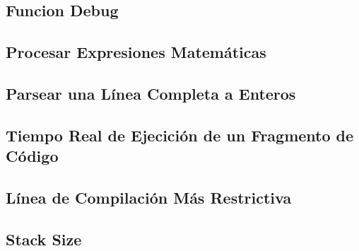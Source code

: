 \subsection{Funcion Debug}
\raggedbottom
\hrulefill
\subsection{Procesar Expresiones Matem\'aticas}
\raggedbottom
\hrulefill
\subsection{Parsear una L\'inea Completa a Enteros}
\raggedbottom
\hrulefill
\subsection{Tiempo Real de Ejecici\'on de un Fragmento de C\'odigo}
\raggedbottom
\hrulefill
\subsection{L\'inea de Compilaci\'on M\'as Restrictiva}
\raggedbottom
\hrulefill
\subsection{Stack Size}
\raggedbottom
\hrulefill

